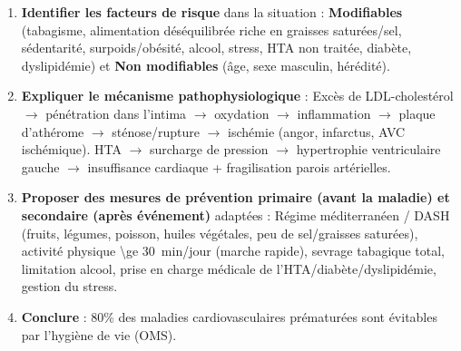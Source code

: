 \documentclass[11pt]{article}
\begin{document}
\begin{methode}
\begin{enumerate}
\item \textbf{Identifier les facteurs de risque} dans la situation : \textbf{Modifiables} (tabagisme, alimentation déséquilibrée riche en graisses saturées/sel, sédentarité, surpoids/obésité, alcool, stress, HTA non traitée, diabète, dyslipidémie) et \textbf{Non modifiables} (âge, sexe masculin, hérédité).
\item \textbf{Expliquer le mécanisme pathophysiologique} : Excès de LDL-cholestérol $\rightarrow$ pénétration dans l'intima $\rightarrow$ oxydation $\rightarrow$ inflammation $\rightarrow$ plaque d'athérome $\rightarrow$ sténose/rupture $\rightarrow$ ischémie (angor, infarctus, AVC ischémique). HTA $\rightarrow$ surcharge de pression $\rightarrow$ hypertrophie ventriculaire gauche $\rightarrow$ insuffisance cardiaque + fragilisation parois artérielles.
\item \textbf{Proposer des mesures de prévention primaire (avant la maladie) et secondaire (après événement)} adaptées : Régime méditerranéen / DASH (fruits, légumes, poisson, huiles végétales, peu de sel/graisses saturées), activité physique \SI{\ge 30}{min}/jour (marche rapide), sevrage tabagique total, limitation alcool, prise en charge médicale de l'HTA/diabète/dyslipidémie, gestion du stress.
\item \textbf{Conclure} : 80\% des maladies cardiovasculaires prématurées sont évitables par l'hygiène de vie (OMS).
\end{enumerate}
\end{methode}
\end{document}

